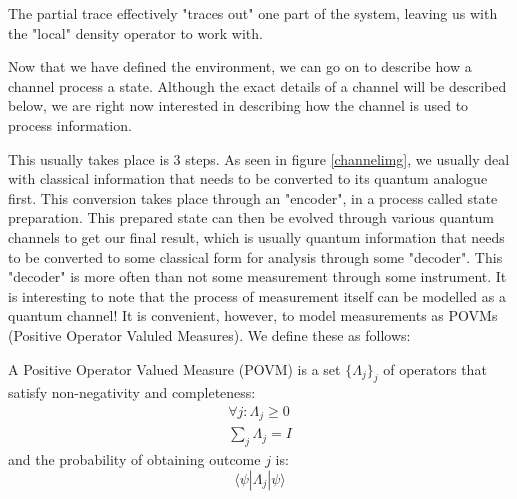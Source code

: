The partial trace effectively "traces out" one part of the system, leaving us with the "local" density operator to work with.

Now that we have defined the environment, we can go on to describe how a channel process a state. Although
the exact details of a channel will be described below, we are right now interested in describing how
the channel is used to process information.

This usually takes place is 3 steps. As seen in figure \ref{channelimg}, we usually deal with classical
information that needs to be converted to its quantum analogue first. This conversion takes place
through an "encoder", in a process called state preparation. This prepared state can then be evolved
through various quantum channels to get our final result, which is usually quantum information that
needs to be converted to some classical form for analysis through some "decoder". This "decoder" is
more often than not some measurement through some instrument. It is interesting to note that the process
of measurement itself can be modelled as a quantum channel! It is convenient, however, to model
measurements as POVMs (Positive Operator Valuled Measures). We define these as follows:

\begin{definition}[POVM]
    A Positive Operator Valued Measure (POVM) is a set $\{\Lambda_j\}_j$ of operators that satisfy
    non-negativity and completeness:
    \begin{align}
        \forall j : \Lambda_j \geq 0 \\
        \displaystyle\sum_{j} \Lambda_j = I
    \end{align}
    and the probability of obtaining outcome $j$ is:
    \begin{equation}
        \langle \psi | \Lambda_j | \psi \rangle
    \end{equation}
\end{definition}

